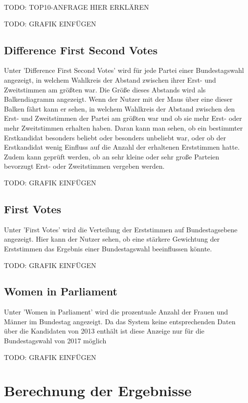 \documentclass[a4paper]{scrreprt}
\begin{document}
TODO: TOP10-ANFRAGE HIER ERKLÄREN

TODO: GRAFIK EINFÜGEN

\subsection{Difference First Second Votes}

Unter 'Difference First Second Votes' wird für jede Partei einer Bundestagswahl angezeigt, in welchem Wahlkreis der Abstand zwischen ihrer Erst- und Zweitstimmen am größten war. Die Größe dieses Abstands wird als Balkendiagramm angezeigt. Wenn der Nutzer mit der Maus über eine dieser Balken fährt kann er sehen, in welchem Wahlkreis der Abstand zwischen den Erst- und Zweitstimmen der Partei am größten war und ob sie mehr Erst- oder mehr Zweitstimmen erhalten haben. Daran kann man sehen, ob ein bestimmter Erstkandidat besonders beliebt oder besonders unbeliebt war, oder ob der Erstkandidat wenig Einfluss auf die Anzahl der erhaltenen Erststimmen hatte. Zudem kann geprüft werden, ob an sehr kleine oder sehr große Parteien bevorzugt Erst- oder Zweitstimmen vergeben werden. 

TODO: GRAFIK EINFÜGEN

\subsection{First Votes}

Unter 'First Votes' wird die Verteilung der Erststimmen auf Bundestagsebene angezeigt. Hier kann der Nutzer sehen, ob eine stärkere Gewichtung der Erststimmen das Ergebnis einer Bundestagswahl beeinflussen könnte.

TODO: GRAFIK EINFÜGEN

\subsection{Women in Parliament}

Unter 'Women in Parliament' wird die prozentuale Anzahl der Frauen und Männer im Bundestag angezeigt. Da das System keine entsprechenden Daten über die Kandidaten von 2013 enthält ist diese Anzeige nur für die Bundestagswahl von 2017 möglich

TODO: GRAFIK EINFÜGEN


\section{Berechnung der Ergebnisse}
\end{document}
